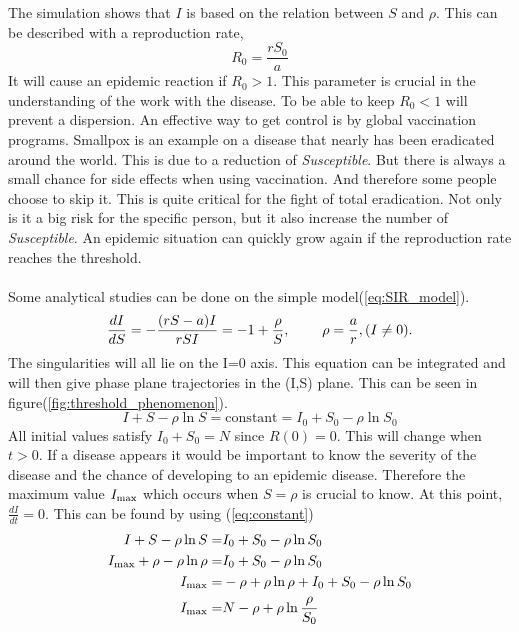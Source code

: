 \documentclass[%
twoside,                 %
final,                   %
10pt]{article}
\begin{document}
The simulation shows that $I$ is based on the relation between $S$ and $\rho$. This can be described with a reproduction rate,
\begin{equation}
R_0 = \frac{rS_0}{a}
\end{equation}
It will cause an epidemic reaction if $R_0 > 1$. This parameter is crucial in the understanding of the work with the disease. To be able to keep $R_0 < 1$ will prevent a dispersion. An effective way to get control is by global vaccination programs. Smallpox is an example on a disease that nearly has been eradicated around the world. This is due to a reduction of \emph{Susceptible}. But there is always a small chance for side effects when using vaccination. And therefore some people choose to skip it. This is quite critical for the fight of total eradication. Not only is it a big risk for the specific person, but it also increase the number of \emph{Susceptible}. An epidemic situation can quickly grow again if the reproduction rate reaches the threshold.
\\
\\
Some analytical studies can be done on the simple model(\ref{eq:SIR_model}).
\begin{equation} 
\frac{dI}{dS} = -\frac{(rS-a)I}{rSI} = -1 + \frac{\rho}{S},\hspace{8mm}\rho=\frac{a}{r}, (I\neq0).
\end{equation}
The singularities will all lie on the I=0 axis. This equation can be integrated and will then give phase plane trajectories in the (I,S) plane. This can be seen in figure(\ref{fig:threshold_phenomenon}).
\begin{equation} \label{eq:constant}
I+S-\rho \ln S = \textrm{constant} = I_0 + S_0 - \rho \ln S_0
\end{equation}
All initial values satisfy $I_0+S_0=N$ since $R(0) = 0$. This will change when $t>0$. If a disease appears it would be important to know the severity of the disease and the chance of developing to an epidemic disease. Therefore the maximum value $I_{\textrm{max}}$ which occurs when $S=\rho$ is crucial to know. At this point, $\frac{dI}{dt}=0$. This can be found by using (\ref{eq:constant})
\begin{align} 
I+S-\rho \ln S =& I_0 + S_0 - \rho \ln S_0 \nonumber \\
I_{\textrm{max}}+\rho-\rho \ln \rho =& I_0 + S_0 - \rho \ln S_0\nonumber \\
I_{\textrm{max}}=&- \rho+\rho \ln \rho + I_0 + S_0 - \rho \ln S_0\nonumber \\
I_{\textrm{max}}=&N - \rho + \rho \ln\frac{\rho}{S_0} \label{eq:max_I}
\end{align}
\end{document}
